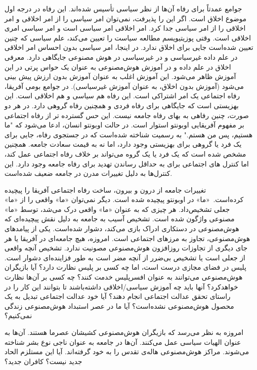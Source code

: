 جوامع عمدتاً برای رفاه آن‌ها از نظر سیاسی تأسیس شده‌اند.
این رفاه در درجه اول موضوع اخلاق است.
اگر این را پذیرفت، نمی‌توان امر سیاسی را از امر اخلاقی و امر اخلاقی را از امر سیاسی جدا کرد.
امر اخلاقی امر سیاسی است و امر سیاسی امری اخلاقی است.
وقتی پوزیتیویسم مطالعه سیاست را تعیین می‌کند، علم سیاسی که چنین تعیین شده‌است جایی برای اخلاق ندارد.
در اینجا، امر سیاسی بدون احساس امر اخلاقی در علم داده غیرسیاسی و در غیرسیاسی در هوش مصنوعی جایگاهی دارد.
معرفی اخلاق در علم داده و در آموزش هوش‌مصنوعی به عنوان یک حواس پرتی در این آموزش ظاهر می‌شود.
این آموزش اغلب به عنوان آموزش بدون ارزش پیش بینی می‌شود (آموزش بدون اخلاق، به عنوان آموزش غیرسیاسی).
در جوامع بومی آفریقا، رفاه اجتماعی یک امر اشتراکی است.
این رفاه هم سیاسی و هم اخلاقی است.
این بهزیستی است که جایگاهی برای رفاه فردی و همچنین رفاه گروهی دارد.
در هر دو صورت، چنین رفاهی به بهای رفاه جامعه نیست.
این حس گسترده تر از رفاه اجتماعی بر مفهوم آفریقایی اوبونتو استوار است.
در حالت اوبونتو انسان، ادعا می‌شود که "ما هستیم، پس من هستم." به رسمیت شناخته شده‌است که در جستجوی رفاه، جایی برای یک فرد یا گروهی برای بهزیستی وجود دارد، اما نه به قیمت سعادت جامعه.
همچنین مشخص شده است که یک فرد یا یک گروه می‌تواند بر خلاف رفاه اجتماعی عمل کند، اما کنترل های اجتماعی برای به حداقل رساندن تهدید برای رفاه جامعه وجود دارد.
این کنترل‌ها به دلیل تغییرات مدرن در جامعه ضعیف شده‌است.

تغییرات جامعه از درون و بیرون، ساخت رفاه اجتماعی آفریقا را پیچیده کرده‌است.\ «ما» در اوبونتو پیچیده شده است.
دیگر نمی‌توان «ما» واقعی را از «ما» جعلی تشخیص‌داد.
هر چیزی که به عنوان «ما» واقعی درک می‌شد، توسط «ما» مصنوعی واژگون شده است.
تشخیص آسیب به جامعه به دلیل نقش پیچیده‌ای که هوش‌مصنوعی در دستکاری ادراک بازی می‌کند، دشوار شده‌است.
یکی از پیامدهای هوش‌مصنوعی، تجاوز به مرزهای اجتماعی است.
امروزه، هیچ جامعه‌ای در آفریقا یا هر جای دیگری از تجاوزات روزافزون هوش‌مصنوعی مصونیت ندارد.
تشخیص آنچه واقعی از جعلی است یا تشخیص بی‌ضرر از آنچه مضر است به طور فزاینده‌ای دشوار است.
پلیس در فضای مجازی درست است، اما چه کسی بر پلیس نظارت دارد؟ آیا بازیگران هوش‌مصنوعی می‌توانند به عنوان افسر‌پلیس خدمت کنند؟ چه کسی بر آن‌ها نظارت خواهد‌کرد؟ آنها باید چه آموزش سیاسی/اخلاقی داشته‌باشند تا بتوانند این کار را در راستای تحقق عدالت اجتماعی انجام دهند؟ آیا خود عدالت اجتماعی تبدیل به یک محصول هوش‌مصنوعی نشده‌است؟ آیا ما در عصر استبداد هوش‌مصنوعی زندگی نمی‌کنیم؟

امروزه به نظر می‌رسد که بازیگران هوش‌مصنوعی کشیشان عصر‌ما هستند.
آن‌ها به عنوان الهیات سیاسی عمل می‌کنند.
آن‌ها در جامعه به عنوان ناجی نوع بشر شناخته می‌شوند.
مراکز هوش‌مصنوعی هاله‌ی تقدس را به خود گرفته‌اند.
آیا این مستلزم الحاد جدید نیست؟ کافران جدید؟
\newline
\newline



